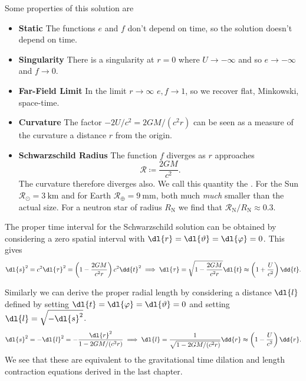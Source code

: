 \documentclass[fleqn]{NotesClass}
\begin{document}
    Some properties of this solution are
    \begin{itemize}
        \item \textbf{Static} The functions \(e\) and \(f\) don't depend on time, so the solution doesn't depend on time.
        \item \textbf{Singularity} There is a singularity at \(r = 0\) where \(U \to -\infty\) and so \(e \to -\infty\) and \(f \to 0\).
        \item \textbf{Far-Field Limit} In the limit \(r \to \infty\) \(e, f \to 1\), so we recover flat, Minkowski, space-time.
        \item \textbf{Curvature} The factor \(-2U/c^2 = 2GM/(c^2r)\) can be seen as a measure of the curvature a distance \(r\) from the origin.
        \item \textbf{Schwarzschild Radius} The function \(f\) diverges as \(r\) approaches
        \begin{equation}
            \mathcal{R} \coloneqq \frac{2GM}{c^2}.
        \end{equation}
        The curvature therefore diverges also.
        We call this quantity the .
        For the Sun \(\mathcal{R}_{\odot} = \qty{3}{\kilo\metre}\) and for Earth \(\mathcal{R}_{\oplus} = \qty{9}{\milli\metre}\), both much \emph{much} smaller than the actual size.
        For a neutron star of radius \(R_{\mathrm{N}}\) we find that \(\mathcal{R}_{\mathrm{N}} / R_{\mathrm{N}} \approx 0.3\).
    \end{itemize}
    
    The proper time interval for the Schwarzschild solution can be obtained by considering a zero spatial interval with \(\dl{r} = \dl{\vartheta} = \dl{\varphi} = 0\).
    This gives
    \begin{equation}
        \dl{s}^2 = c^2\dl{\tau}^2 = \left( 1 - \frac{2GM}{c^2r} \right) c^2\dd{t}^2 \implies \dl{\tau} = \sqrt{1 - \frac{2GM}{c^2r}} \dl{t} \approx \left( 1 + \frac{U}{c^2} \right) \dd{t}.
    \end{equation}

    Similarly we can derive the proper radial length by considering a distance \(\dl{l}\) defined by setting \(\dl{t} = \dl{\varphi} = \dl{\vartheta} = 0\) and setting \(\dl{l} = \sqrt{-\dl{s}^2}\).
    \begin{equation}
        \dl{s}^2 = -\dl{l}^2 = - \frac{\dl{r}^2}{1 - 2GM/(c^2r)} \implies \dl{l} = \frac{1}{\sqrt{1 - 2GM/(c^2r)}} \dd{r} \approx \left( 1 - \frac{U}{c^2} \right)\dd{r}.
    \end{equation}
    We see that these are equivalent to the gravitational time dilation and length contraction equations derived in the last chapter.
    
\end{document}
